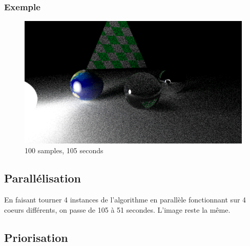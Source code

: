 \documentclass[handout]{beamer}
\begin{document}
\begin{frame}

    \frametitle{Exemple}
    \begin{figure}
        \includegraphics[scale=0.25]{night.png}
        \caption{100 samples, 105 seconds}
    \end{figure}
    
\end{frame}

\subsection{Parallélisation}

\begin{frame}

    En faisant tourner 4 instances de l'algorithme en parallèle fonctionnant sur 4 coeurs différents, on passe de 105 à 51 secondes.
    L'image reste la même.

\end{frame}

\subsection{Priorisation}
\end{document}
